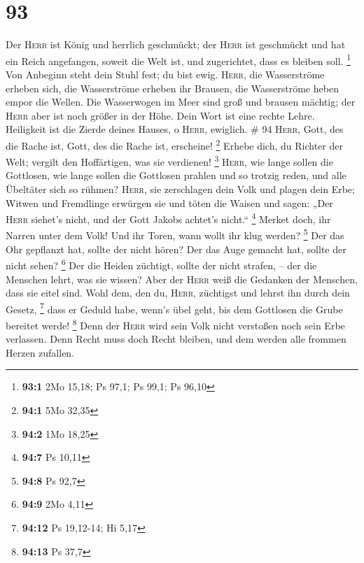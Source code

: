 \hypertarget{section-30}{%
\section{93}\label{section-30}}

 Der \textsc{Herr} ist König und herrlich geschmückt; der
\textsc{Herr} ist geschmückt und hat ein Reich angefangen, soweit die
Welt ist, und zugerichtet, dass es bleiben soll. \footnote{\textbf{93:1}
  2Mo 15,18; Ps 97,1; Ps 99,1; Ps 96,10}  Von Anbeginn
steht dein Stuhl fest; du bist ewig.  \textsc{Herr}, die
Wasserströme erheben sich, die Wasserströme erheben ihr Brausen, die
Wasserströme heben empor die Wellen.  Die Wasserwogen im
Meer sind groß und brausen mächtig; der \textsc{Herr} aber ist noch
größer in der Höhe.  Dein Wort ist eine rechte Lehre.
Heiligkeit ist die Zierde deines Hauses, o \textsc{Herr}, ewiglich. \#
94  \textsc{Herr}, Gott, des die Rache ist, Gott, des die
Rache ist, erscheine! \footnote{\textbf{94:1} 5Mo 32,35} 
Erhebe dich, du Richter der Welt; vergilt den Hoffärtigen, was sie
verdienen! \footnote{\textbf{94:2} 1Mo 18,25} 
\textsc{Herr}, wie lange sollen die Gottlosen, wie lange sollen die
Gottlosen prahlen  und so trotzig reden, und alle
Übeltäter sich so rühmen?  \textsc{Herr}, sie zerschlagen
dein Volk und plagen dein Erbe;  Witwen und Fremdlinge
erwürgen sie und töten die Waisen  und sagen: „Der
\textsc{Herr} siehet's nicht, und der Gott Jakobs achtet's nicht.``
\footnote{\textbf{94:7} Ps 10,11}  Merket doch, ihr Narren
unter dem Volk! Und ihr Toren, wann wollt ihr klug werden? \footnote{\textbf{94:8}
  Ps 92,7}  Der das Ohr gepflanzt hat, sollte der nicht
hören? Der das Auge gemacht hat, sollte der nicht sehen? \footnote{\textbf{94:9}
  2Mo 4,11}  Der die Heiden züchtigt, sollte der nicht
strafen, -- der die Menschen lehrt, was sie wissen?  Aber
der \textsc{Herr} weiß die Gedanken der Menschen, dass sie eitel sind.
 Wohl dem, den du, \textsc{Herr}, züchtigst und lehrst
ihn durch dein Gesetz, \footnote{\textbf{94:12} Ps 19,12-14; Hi 5,17}
 dass er Geduld habe, wenn's übel geht, bis dem Gottlosen
die Grube bereitet werde! \footnote{\textbf{94:13} Ps 37,7}
 Denn der \textsc{Herr} wird sein Volk nicht verstoßen
noch sein Erbe verlassen.  Denn Recht muss doch Recht
bleiben, und dem werden alle frommen Herzen zufallen. 
